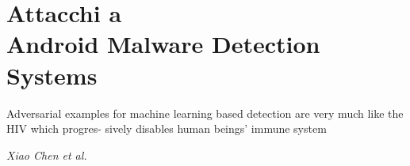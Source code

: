 \graphicspath{ {aml_vs_md/imgs/} }

\section{Attacchi a\\Android Malware Detection Systems}

\epigraph{Adversarial examples for machine learning based detection are very much like the HIV which progres- sively disables human beings’ immune system}{\textit{Xiao Chen et al.} \cite{hiv}}




